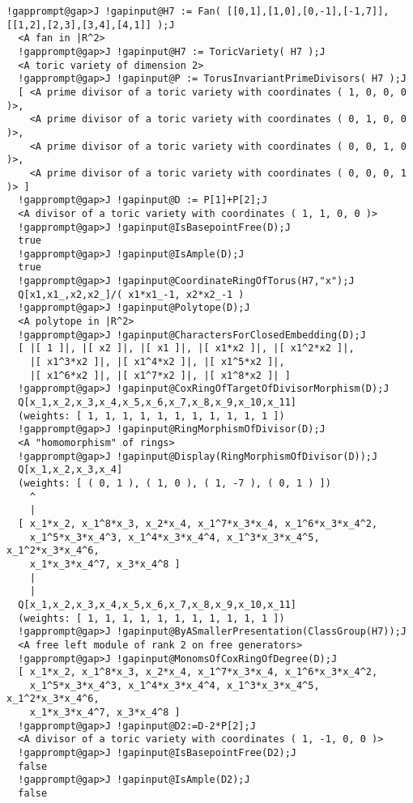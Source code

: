 \documentclass[a4paper,11pt]{report}
\begin{document}
{{{\begin{Verbatim}[commandchars=!@J,fontsize=\small,frame=single,label=Example]
  !gapprompt@gap>J !gapinput@H7 := Fan( [[0,1],[1,0],[0,-1],[-1,7]],[[1,2],[2,3],[3,4],[4,1]] );J
  <A fan in |R^2>
  !gapprompt@gap>J !gapinput@H7 := ToricVariety( H7 );J
  <A toric variety of dimension 2>
  !gapprompt@gap>J !gapinput@P := TorusInvariantPrimeDivisors( H7 );J
  [ <A prime divisor of a toric variety with coordinates ( 1, 0, 0, 0 )>,
    <A prime divisor of a toric variety with coordinates ( 0, 1, 0, 0 )>,
    <A prime divisor of a toric variety with coordinates ( 0, 0, 1, 0 )>,
    <A prime divisor of a toric variety with coordinates ( 0, 0, 0, 1 )> ]
  !gapprompt@gap>J !gapinput@D := P[1]+P[2];J
  <A divisor of a toric variety with coordinates ( 1, 1, 0, 0 )>
  !gapprompt@gap>J !gapinput@IsBasepointFree(D);J
  true
  !gapprompt@gap>J !gapinput@IsAmple(D);J
  true
  !gapprompt@gap>J !gapinput@CoordinateRingOfTorus(H7,"x");J
  Q[x1,x1_,x2,x2_]/( x1*x1_-1, x2*x2_-1 )
  !gapprompt@gap>J !gapinput@Polytope(D);J
  <A polytope in |R^2>
  !gapprompt@gap>J !gapinput@CharactersForClosedEmbedding(D);J
  [ |[ 1 ]|, |[ x2 ]|, |[ x1 ]|, |[ x1*x2 ]|, |[ x1^2*x2 ]|, 
    |[ x1^3*x2 ]|, |[ x1^4*x2 ]|, |[ x1^5*x2 ]|, 
    |[ x1^6*x2 ]|, |[ x1^7*x2 ]|, |[ x1^8*x2 ]| ]
  !gapprompt@gap>J !gapinput@CoxRingOfTargetOfDivisorMorphism(D);J
  Q[x_1,x_2,x_3,x_4,x_5,x_6,x_7,x_8,x_9,x_10,x_11]
  (weights: [ 1, 1, 1, 1, 1, 1, 1, 1, 1, 1, 1 ])
  !gapprompt@gap>J !gapinput@RingMorphismOfDivisor(D);J
  <A "homomorphism" of rings>
  !gapprompt@gap>J !gapinput@Display(RingMorphismOfDivisor(D));J
  Q[x_1,x_2,x_3,x_4]
  (weights: [ ( 0, 1 ), ( 1, 0 ), ( 1, -7 ), ( 0, 1 ) ])
    ^
    |
  [ x_1*x_2, x_1^8*x_3, x_2*x_4, x_1^7*x_3*x_4, x_1^6*x_3*x_4^2, 
    x_1^5*x_3*x_4^3, x_1^4*x_3*x_4^4, x_1^3*x_3*x_4^5, x_1^2*x_3*x_4^6, 
    x_1*x_3*x_4^7, x_3*x_4^8 ]
    |
    |
  Q[x_1,x_2,x_3,x_4,x_5,x_6,x_7,x_8,x_9,x_10,x_11]
  (weights: [ 1, 1, 1, 1, 1, 1, 1, 1, 1, 1, 1 ])
  !gapprompt@gap>J !gapinput@ByASmallerPresentation(ClassGroup(H7));J
  <A free left module of rank 2 on free generators>
  !gapprompt@gap>J !gapinput@MonomsOfCoxRingOfDegree(D);J
  [ x_1*x_2, x_1^8*x_3, x_2*x_4, x_1^7*x_3*x_4, x_1^6*x_3*x_4^2, 
    x_1^5*x_3*x_4^3, x_1^4*x_3*x_4^4, x_1^3*x_3*x_4^5, x_1^2*x_3*x_4^6, 
    x_1*x_3*x_4^7, x_3*x_4^8 ]
  !gapprompt@gap>J !gapinput@D2:=D-2*P[2];J
  <A divisor of a toric variety with coordinates ( 1, -1, 0, 0 )>
  !gapprompt@gap>J !gapinput@IsBasepointFree(D2);J
  false
  !gapprompt@gap>J !gapinput@IsAmple(D2);J
  false
\end{Verbatim}
 

}}}
\end{document}
